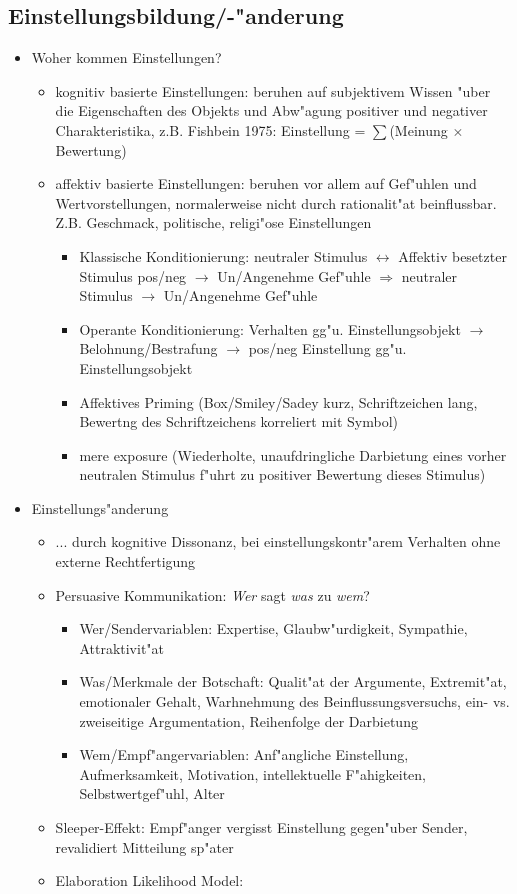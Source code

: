 \subsection{Einstellungsbildung/-"anderung}
\begin{itemize}
	\item
		Woher kommen Einstellungen?
		\begin{itemize}
			\item
				kognitiv basierte Einstellungen: beruhen auf subjektivem Wissen "uber die Eigenschaften des Objekts und Abw"agung positiver und negativer Charakteristika, z.B. Fishbein 1975: Einstellung = $\sum$(Meinung $\times$ Bewertung)
			\item
				affektiv basierte Einstellungen: beruhen vor allem auf Gef"uhlen und Wertvorstellungen, normalerweise nicht durch rationalit"at beinflussbar. Z.B. Geschmack, politische, religi"ose Einstellungen
				\begin{itemize}
					\item
						Klassische Konditionierung: neutraler Stimulus $\leftrightarrow$ Affektiv besetzter Stimulus pos/neg  $\rightarrow$ Un/Angenehme Gef"uhle $\Rightarrow$ neutraler Stimulus  $\rightarrow$ Un/Angenehme Gef"uhle
					\item
						Operante Konditionierung: Verhalten gg"u. Einstellungsobjekt $\rightarrow$ Belohnung/Bestrafung $\rightarrow$ pos/neg Einstellung gg"u. Einstellungsobjekt
					\item
						Affektives Priming (Box/Smiley/Sadey kurz, Schriftzeichen lang, Bewertng des Schriftzeichens korreliert mit Symbol)

					\item
						mere exposure (Wiederholte, unaufdringliche Darbietung eines vorher neutralen Stimulus f"uhrt zu positiver Bewertung dieses Stimulus)
				\end{itemize}
		\end{itemize}
	\item
		Einstellungs"anderung
		\begin{itemize}
			\item
				... durch kognitive Dissonanz, bei einstellungskontr"arem Verhalten ohne externe Rechtfertigung
			\item
				Persuasive Kommunikation: \emph{Wer} sagt \emph{was} zu \emph{wem}?
				\begin{itemize}
					\item
						Wer/Sendervariablen: Expertise, Glaubw"urdigkeit, Sympathie, Attraktivit"at
					\item
						Was/Merkmale der Botschaft: Qualit"at der Argumente, Extremit"at, emotionaler Gehalt, Warhnehmung des Beinflussungsversuchs, ein- vs. zweiseitige Argumentation, Reihenfolge der Darbietung
					\item
						Wem/Empf"angervariablen: Anf"angliche Einstellung, Aufmerksamkeit, Motivation, intellektuelle F"ahigkeiten, Selbstwertgef"uhl, Alter
				\end{itemize}
			\item
				Sleeper-Effekt: Empf"anger vergisst Einstellung gegen"uber Sender, revalidiert Mitteilung sp"ater
			\item
				Elaboration Likelihood Model:


\end{itemize}
\end{itemize}
